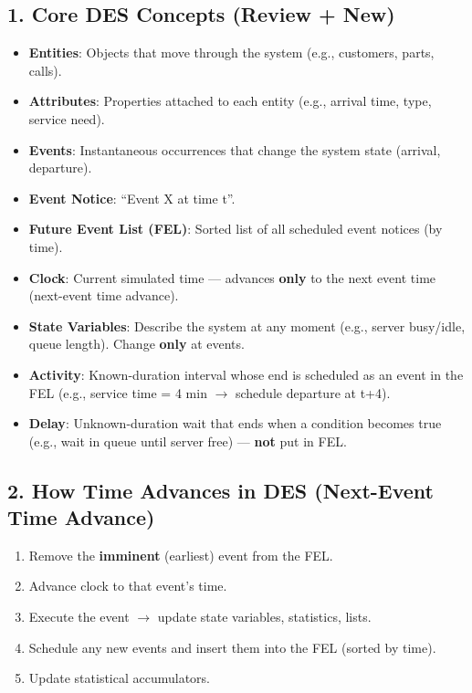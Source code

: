 \documentclass[11pt]{article}
\begin{document}
\subsection*{1. Core DES Concepts (Review + New)}
\begin{itemize}[leftmargin=*]
\item \textbf{Entities}: Objects that move through the system (e.g., customers, parts, calls).
\item \textbf{Attributes}: Properties attached to each entity (e.g., arrival time, type, service need).
\item \textbf{Events}: Instantaneous occurrences that change the system state (arrival, departure).
\item \textbf{Event Notice}: ``Event X at time t''.
\item \textbf{Future Event List (FEL)}: Sorted list of all scheduled event notices (by time).
\item \textbf{Clock}: Current simulated time --- advances \textbf{only} to the next event time (next-event time advance).
\item \textbf{State Variables}: Describe the system at any moment (e.g., server busy/idle, queue length). Change \textbf{only} at events.
\item \textbf{Activity}: Known-duration interval whose end is scheduled as an event in the FEL (e.g., service time = 4 min $\rightarrow$ schedule departure at t+4).
\item \textbf{Delay}: Unknown-duration wait that ends when a condition becomes true (e.g., wait in queue until server free) --- \textbf{not} put in FEL.
\end{itemize}

\subsection*{2. How Time Advances in DES (Next-Event Time Advance)}
\begin{enumerate}[leftmargin=*]
\item Remove the \textbf{imminent} (earliest) event from the FEL.  
\item Advance clock to that event's time.  
\item Execute the event $\rightarrow$ update state variables, statistics, lists.  
\item Schedule any new events and insert them into the FEL (sorted by time).  
\item Update statistical accumulators.  
\end{enumerate}
\end{document}
